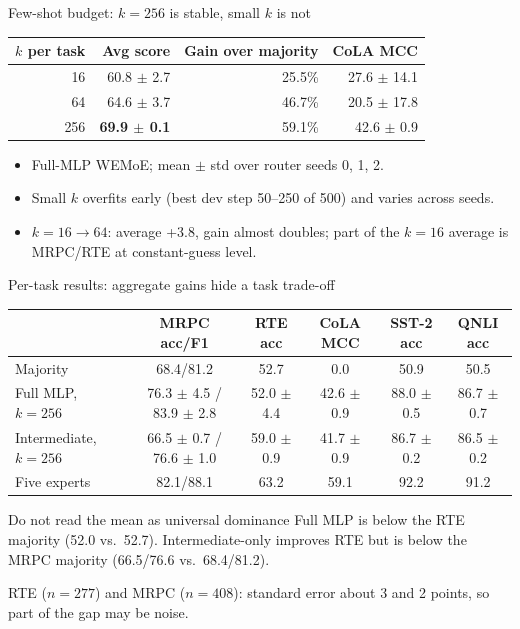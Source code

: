 \documentclass[aspectratio=169,10pt]{beamer}
\begin{document}
\begin{frame}{Few-shot budget: $k=256$ is stable, small $k$ is not}
  \centering
  \begin{tabular}{r r r r}
    \toprule
    $k$ per task & Avg score & Gain over majority & CoLA MCC\\
    \midrule
    16 & 60.8 $\pm$ 2.7 & 25.5\% & 27.6 $\pm$ 14.1\\
    64 & 64.6 $\pm$ 3.7 & 46.7\% & 20.5 $\pm$ 17.8\\
    256 & \textbf{69.9 $\pm$ 0.1} & 59.1\% & 42.6 $\pm$ 0.9\\
    \bottomrule
  \end{tabular}
  \vfill
  \raggedright
  \begin{itemize}
    \item Full-MLP WEMoE; mean $\pm$ std over router seeds 0, 1, 2.
    \item Small $k$ overfits early (best dev step 50--250 of 500) and varies across seeds.
    \item $k=16\to64$: average +3.8, gain almost doubles; part of the $k=16$ average is MRPC/RTE at constant-guess level.
  \end{itemize}
\end{frame}

\begin{frame}{Per-task results: aggregate gains hide a task trade-off}
  \centering
  \scriptsize
  \begin{tabular}{l c c c c c}
    \toprule
    & MRPC acc/F1 & RTE acc & CoLA MCC & SST-2 acc & QNLI acc\\
    \midrule
    Majority & 68.4/81.2 & 52.7 & 0.0 & 50.9 & 50.5\\
    Full MLP, $k=256$ & 76.3 $\pm$ 4.5 / 83.9 $\pm$ 2.8 & 52.0 $\pm$ 4.4 & 42.6 $\pm$ 0.9 & 88.0 $\pm$ 0.5 & 86.7 $\pm$ 0.7\\
    Intermediate, $k=256$ & 66.5 $\pm$ 0.7 / 76.6 $\pm$ 1.0 & 59.0 $\pm$ 0.9 & 41.7 $\pm$ 0.9 & 86.7 $\pm$ 0.2 & 86.5 $\pm$ 0.2\\
    Five experts & 82.1/88.1 & 63.2 & 59.1 & 92.2 & 91.2\\
    \bottomrule
  \end{tabular}
  \vfill
  \begin{alertblock}{Do not read the mean as universal dominance}
    Full MLP is below the RTE majority (52.0 vs.\ 52.7). Intermediate-only improves RTE but is below the MRPC majority (66.5/76.6 vs.\ 68.4/81.2).
  \end{alertblock}
  \vspace{-2pt}
  {\scriptsize RTE ($n=277$) and MRPC ($n=408$): standard error about 3 and 2 points, so part of the gap may be noise.}
\end{frame}
\end{document}
